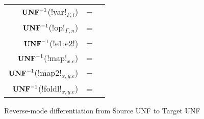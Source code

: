 \begin{figure*}[t]
    \begin{tabular}{r c l}
    $\mathbf{UNF}^{-1}$(!var!$_{\Gamma,i}$) &=& \\
    $\mathbf{UNF}^{-1}$(!op!$_{\Gamma,n}$) &=&  \\ 
    $\mathbf{UNF}^{-1}$(!e1;e2!) &=& \\ 
    $\mathbf{UNF}^{-1}$(!map!$_{x.e}$) &=&  \\ 
    $\mathbf{UNF}^{-1}$(!map2!$_{x,y.e}$) &=&  \\ 
    $\mathbf{UNF}^{-1}$(!foldl!$_{x,y.e}$) &=&  \\  
    \end{tabular}
    \caption{Reverse-mode differentiation from Source UNF to Target UNF}
    \label{fig:diff_macro}
    \end{figure*}